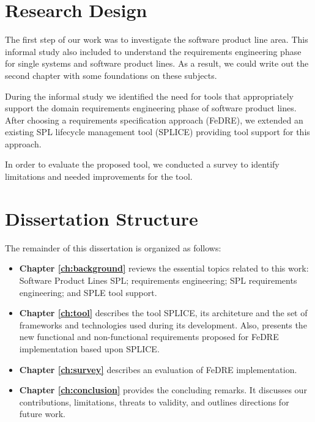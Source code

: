 \section{Research Design}
\label{sc:design}

The first step of our work was to investigate the software product line area. This informal 
study also included to understand the requirements engineering phase for single systems and 
software product lines. As a result, we could write out the second chapter with some foundations 
on these subjects.
 
During the informal study we identified the need for tools that appropriately support the domain 
requirements engineering phase of software product lines. After choosing a requirements specification 
approach (\ac{FeDRE}), we extended an existing \ac{SPL} lifecycle management tool (\ac{SPLICE}) providing tool support 
for this approach.

In order to evaluate the proposed tool, we conducted a survey to identify limitations and needed 
improvements for the tool.  

\section{Dissertation Structure}
\label{sc:structure}
The remainder of this dissertation is organized as follows:

\begin{itemize}
\item \textbf{ Chapter \ref{ch:background} } reviews the essential topics
related to this work: Software Product Lines \ac{SPL}; requirements
engineering; \ac{SPL} requirements engineering; and \ac{SPLE} tool support.

\item \textbf{ Chapter \ref{ch:tool} } describes the tool \ac{SPLICE}, its
architeture and the set of frameworks and technologies used during its development. Also,  presents the new functional and non-functional 
requirements proposed for \ac{FeDRE} implementation based upon \ac{SPLICE}.

\item \textbf{ Chapter \ref{ch:survey} } describes an evaluation of \ac{FeDRE}
implementation.

\item \textbf{ Chapter \ref{ch:conclusion} } provides the concluding remarks. It
discusses our contributions, limitations, threats to validity, and outlines directions for future work.




\end{itemize}

